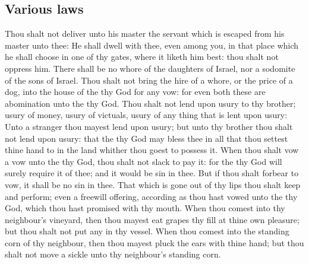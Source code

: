 \begin{biblechapter}
\section*{Various laws}
\verse Thou shalt not deliver unto his master the servant which is escaped from his master unto thee:
\verse He shall dwell with thee, even among you, in that place which he shall choose in one of thy gates, where it liketh him best: thou shalt not oppress him.
\verse There shall be no whore of the daughters of Israel, nor a sodomite of the sons of Israel.
\verse Thou shalt not bring the hire of a whore, or the price of a dog, into the house of the \LORD thy God for any vow: for even both these are abomination unto the \LORD thy God.
\verse Thou shalt not lend upon usury to thy brother; usury of money, usury of victuals, usury of any thing that is lent upon usury:
\verse Unto a stranger thou mayest lend upon usury; but unto thy brother thou shalt not lend upon usury: that the \LORD thy God may bless thee in all that thou settest thine hand to in the land whither thou goest to possess it.
\verse When thou shalt vow a vow unto the \LORD thy God, thou shalt not slack to pay it: for the \LORD thy God will surely require it of thee; and it would be sin in thee.
\verse But if thou shalt forbear to vow, it shall be no sin in thee.
\verse That which is gone out of thy lips thou shalt keep and perform; even a freewill offering, according as thou hast vowed unto the \LORD thy God, which thou hast promised with thy mouth.
\verse When thou comest into thy neighbour's vineyard, then thou mayest eat grapes thy fill at thine own pleasure; but thou shalt not put any in thy vessel.
\verse When thou comest into the standing corn of thy neighbour, then thou mayest pluck the ears with thine hand; but thou shalt not move a sickle unto thy neighbour's standing corn.
\end{biblechapter}


